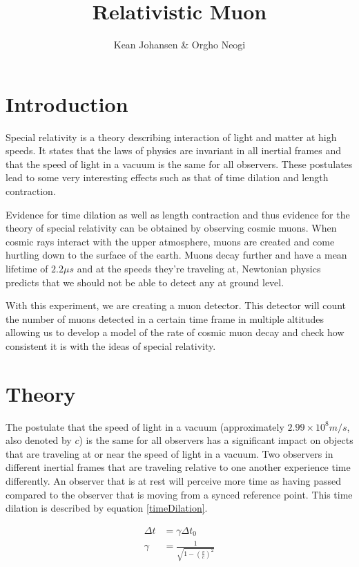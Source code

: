 \documentclass[oneside]{article}
\title{Relativistic Muon}
\author{Kean Johansen \& Orgho Neogi}
\begin{document}
\maketitle

\tableofcontents

\section{Introduction}
  Special relativity is a theory describing interaction of light and matter at high speeds. It states that the laws of physics are invariant in all inertial frames and that the speed of light in a vacuum is the same for all observers. These postulates lead to some very interesting effects such as that of time dilation and length contraction.

  Evidence for time dilation as well as length contraction and thus evidence for the theory of special relativity can be obtained by observing cosmic muons. When cosmic rays interact with the upper atmosphere, muons are created and come hurtling down to the surface of the earth. Muons decay further and have a mean lifetime of $2.2 \mu s$ and at the speeds they're traveling at, Newtonian physics predicts that we should not be able to detect any at ground level.

  With this experiment, we are creating a muon detector. This detector will count the number of muons detected in a certain time frame in multiple altitudes allowing us to develop a model of the rate of cosmic muon decay and check how consistent it is with the ideas of special relativity.

\section{Theory}
  The postulate that the speed of light in a vacuum (approximately $2.99 \times 10^8 m/s$, also denoted by $c$) is the same for all observers has a significant impact on objects that are traveling at or near the speed of light in a vacuum. Two observers in different inertial frames that are traveling relative to one another experience time differently. An observer that is at rest will perceive more time as having passed compared to the observer that is moving from a synced reference point. This time dilation is described by equation \ref{timeDilation}.

  \begin{align}\label{timeDilation}
    \Delta t &= \gamma \Delta t_0 \\
    \gamma &= \frac{1}{\sqrt{1-(\frac{v}{c})^2}} \nonumber
  \end{align}
\end{document}
